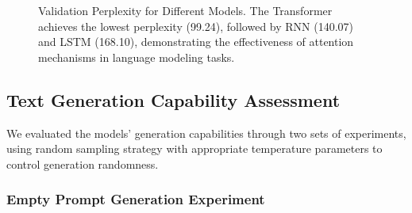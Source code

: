 \documentclass[12pt,oneside]{article}
\begin{document}
\begin{figure}[!htb]
  \centering
  \caption{Validation Perplexity for Different Models. The Transformer achieves the lowest perplexity (99.24), followed by RNN (140.07) and LSTM (168.10), demonstrating the effectiveness of attention mechanisms in language modeling tasks.}
  \label{fig:perplexity}
\end{figure}

\FloatBarrier  %

\subsection{Text Generation Capability Assessment}

We evaluated the models' generation capabilities through two sets of experiments, using random sampling strategy with appropriate temperature parameters to control generation randomness.

\subsubsection{Empty Prompt Generation Experiment}
\end{document}
